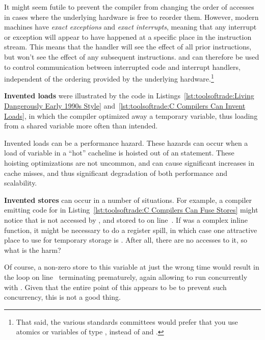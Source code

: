 It might seem futile to prevent the compiler from changing the order of
accesses in cases where the underlying hardware is free to reorder them.
However, modern machines have \emph{exact exceptions} and
\emph{exact interrupts}, meaning that any interrupt or exception will
appear to have happened at a specific place in the instruction
stream.
This means that the handler will see the effect of all prior
instructions, but won't see the effect of any subsequent instructions.
 and  can therefore be used to
control communication between interrupted code and interrupt handlers,
independent of the ordering provided by the underlying hardware.\footnote{
	That said, the various standards committees would prefer that
	you use atomics or variables of type , instead
	of  and .}

{\bf Invented loads} were illustrated by the code in
Listings~\ref{lst:toolsoftrade:Living Dangerously Early 1990s Style}
and~\ref{lst:toolsoftrade:C Compilers Can Invent Loads},
in which the compiler optimized away a temporary variable,
thus loading from a shared variable more often than intended.

Invented loads can be a performance hazard.
These hazards can occur when a load of variable in a ``hot''
cacheline is hoisted out of an  statement.
These hoisting optimizations are not uncommon, and can cause significant
increases in cache misses, and thus significant degradation of
both performance and scalability.

\begin{fcvref}
{\bf Invented stores} can occur in a number of situations.
For example, a compiler emitting code for  in
Listing~\ref{lst:toolsoftrade:C Compilers Can Fuse Stores}
might notice that  is not accessed by
, and stored to on line~.
If  was a complex inline function, it might be
necessary to do a register spill, in which case one attractive
place to use for temporary storage is .
After all, there are no accesses to it, so what is the harm?

Of course, a non-zero store to this variable at just the wrong time
would result in the  loop on
line~ terminating
prematurely, again allowing  to run
concurrently with .
Given that the entire point of this  appears to be to
prevent such concurrency, this is not a good thing.
\end{fcvref}

